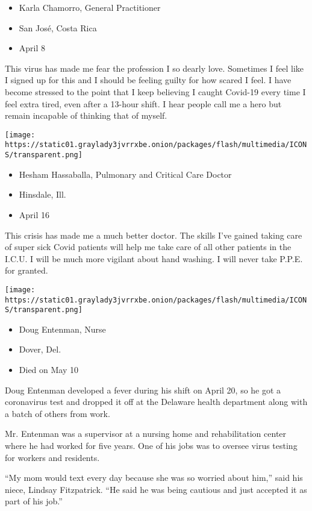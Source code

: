 \begin{itemize}
\tightlist
\item
  Karla Chamorro, General Practitioner
\item
  San José, Costa Rica
\item
  April 8
\end{itemize}

This virus has made me fear the profession I so dearly love. Sometimes I
feel like I signed up for this and I should be feeling guilty for how
scared I feel. I have become stressed to the point that I keep believing
I caught Covid-19 every time I feel extra tired, even after a 13-hour
shift. I hear people call me a hero but remain incapable of thinking
that of myself.

\texttt{[image: https://static01.graylady3jvrrxbe.onion/packages/flash/multimedia/ICONS/transparent.png]}

\begin{itemize}
\tightlist
\item
  Hesham Hassaballa, Pulmonary and Critical Care Doctor
\item
  Hinsdale, Ill.
\item
  April 16
\end{itemize}

This crisis has made me a much better doctor. The skills I've gained
taking care of super sick Covid patients will help me take care of all
other patients in the I.C.U. I will be much more vigilant about hand
washing. I will never take P.P.E. for granted.

\texttt{[image: https://static01.graylady3jvrrxbe.onion/packages/flash/multimedia/ICONS/transparent.png]}

\begin{itemize}
\tightlist
\item
  Doug Entenman, Nurse
\item
  Dover, Del.
\item
  Died on May 10
\end{itemize}

Doug Entenman developed a fever during his shift on April 20, so he got
a coronavirus test and dropped it off at the Delaware health department
along with a batch of others from work.

Mr. Entenman was a supervisor at a nursing home and rehabilitation
center where he had worked for five years. One of his jobs was to
oversee virus testing for workers and residents.

``My mom would text every day because she was so worried about him,''
said his niece, Lindsay Fitzpatrick. ``He said he was being cautious and
just accepted it as part of his job.''

